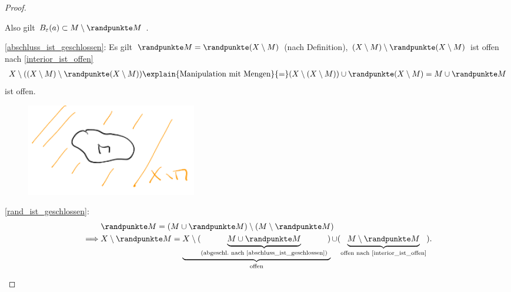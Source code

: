 \begin{proof}
\begin{proofdescription}
        Also gilt \( B_\varepsilon(a)\subset M\setminus \randpunkte M \) \timplies \Beh.
        \item[\ref{abschluss_ist_geschlossen}:] Es gilt \( \randpunkte M=\randpunkte (X\setminus M) \) (nach Definition), \( (X\setminus M)\setminus \randpunkte(X\setminus M) \) ist offen nach \ref{interior_ist_offen} \timplies \begin{align*}
            X\setminus ((X\setminus M)\setminus \randpunkte(X\setminus M))\explain{\text{Manipulation mit Mengen}}{=}(X\setminus(X\setminus M))\cup \randpunkte (X\setminus M)=M\cup \randpunkte M
        \end{align*}
        ist offen.
        \begin{figure}[H]
            \centering
            \includegraphics[width=0.5\linewidth]{figures/menge_und_komplement}
            \label{fig:menge_und_komplement}
        \end{figure}
        \item[\ref{rand_ist_geschlossen}:]
        \begin{align*}
            &\randpunkte M=(M\cup \randpunkte M)\setminus (M\setminus \randpunkte M)\\
            \implies &X\setminus \randpunkte M=\underbrace{X\setminus(\underbrace{M\cup \randpunkte M}_{\text{(abgeschl.\ nach \ref{abschluss_ist_geschlossen})}})}_{\text{offen}}\cup (\underbrace{M\setminus \randpunkte M}_{\text{offen nach \ref{interior_ist_offen}}}).
        \end{align*} 
    \end{proofdescription}
\end{proof}

